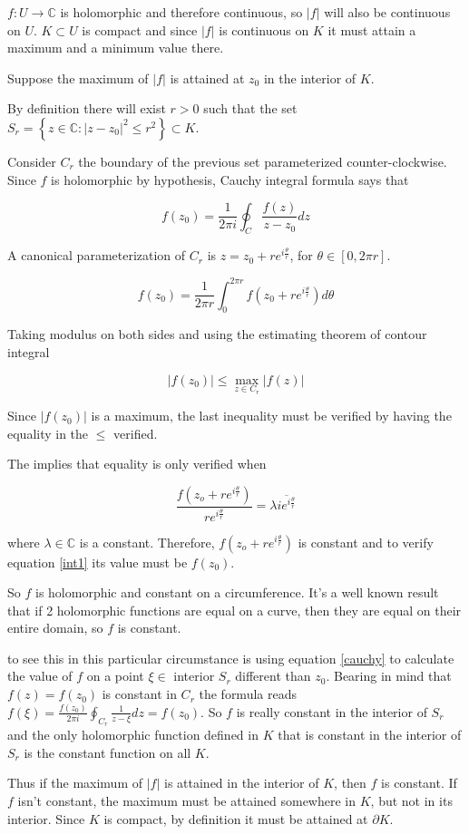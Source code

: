\documentclass[12pt]{article}
\newcommand{\Complex}{\mathbb{C}}
\begin{document}
$f: U \to \Complex $ is holomorphic and therefore continuous, so $|f|$ will also be continuous on $U$.
$K\subset U$ is compact and since $|f|$ is continuous on $K$ it must attain a maximum and a minimum value there.

Suppose the maximum of $|f|$ is attained at $z_0$ in the interior of $K$.

By definition there will exist $r>0$ such that the set $S_r = \left\{z\in \Complex: |z-z_0|^2\le r^2 \right\} \subset K $.

Consider $C_r$ the boundary of the previous set parameterized counter-clockwise.
Since $f$ is holomorphic by hypothesis, Cauchy integral formula says that

\begin{equation}
\label{cauchy}
f(z_0)= \frac{1}{2\pi i} \oint_C \frac{f(z)}{z-z_0} dz
\end{equation}

A canonical parameterization of $C_r$ is $z=z_0 + r e^{i\frac{\theta}{r}}$, for $\theta \in [0,2 \pi r]$.


\begin{equation}
\label{int1}
f(z_0)= \frac{1}{2\pi r} \int_0^{2\pi r}  f(z_0 + r e^{i \frac{\theta}{r}}) d \theta
\end{equation}

Taking modulus on both sides and using the estimating theorem of contour integral

$$|f(z_0)| \le \operatorname{max}_{z \in C_r}|f(z)|$$

Since $|f(z_0)|$ is a maximum, the last inequality must be verified by having the equality in the $\le$ verified.

The  implies that equality is only verified when

$$ \frac{f(z_o + r e^{i \frac{\theta}{r}})}{r e^{i \frac{\theta}{r}}} = \lambda \overline{i e^{i \frac{\theta}{r}}} $$

where $\lambda\in \mathbb{C}$ is a constant.
Therefore, $f(z_o + r e^{i \frac{\theta}{r}})$ is constant and to verify equation \ref{int1} its value must be $f(z_0)$.

So $f$ is holomorphic and constant on a circumference.
It's a well known result that if 2 holomorphic functions are equal on a curve, then they are equal on their entire domain, so $f$ is constant.

 to see this in this particular circumstance is using equation \ref{cauchy} to calculate the value of $f$ on a point $\xi \in $ interior $S_r$ different than $z_0$. Bearing in mind that $f(z)=f(z_0)$ is  constant in $C_r$ the formula reads $f(\xi)=\frac{f(z_0)}{2 \pi i}\oint_{C_r} \frac{1}{z-\xi}dz = f(z_0)$. So $f$ is really constant in the interior of $S_r$ and the only holomorphic function defined in $K$ that is constant in the interior of $S_r$ is the constant function on all $K$. 
 
Thus if the maximum of $|f|$ is attained in the interior of $K$, then $f$ is constant.
If $f$ isn't constant, the maximum must be attained somewhere in $K$, but not in its interior.
Since $K$ is compact, by definition it must be attained at $\partial K$.
\end{document}
